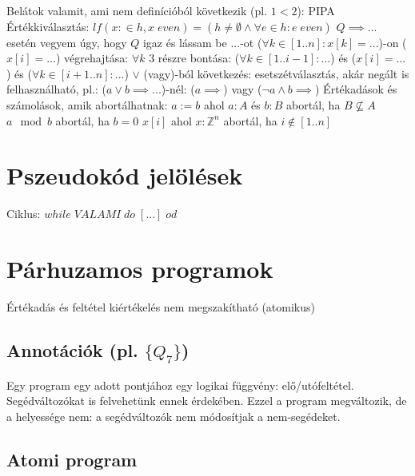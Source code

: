 \documentclass[12pt,a4paper]{article}
\begin{document}
\begin{outline}
	\1 Belátok valamit, ami nem definícióból következik (pl. $1<2$): PIPA
	\1 Értékkiválasztás: $lf(x:\in h, x \; even) = (h \ne \emptyset \wedge \forall e \in h : e \; even)$
	\1 $Q \implies ...$ esetén vegyem úgy, hogy $Q$ igaz és lássam be $...$-ot
	\1 ($\forall k \in [1..n]: x[k]=...$)-on ($x[i]=...$) végrehajtása: $\forall k$ 3 részre bontása: ($\forall k \in [1..i-1]: ...$) és ($x[i]=...$) és ($\forall k \in [i+1..n]: ...$)
	\1 $\lor$ (vagy)-ból következés: esetszétválasztás, akár negált is felhasználható, pl.: ($a \lor b \implies ...$)-nél: ($a \implies$) vagy ($\lnot a \wedge b \implies$)
	\1 Értékadások és számolások, amik abortálhatnak:
		\2 $a := b$ ahol $a : A$ és $b : B$ abortál, ha $B \not \subseteq A$
		\2 $a \mod b$ abortál, ha $b=0$
		\2 $x[i]$ ahol $x:\mathbb{Z}^n$ abortál, ha $i \notin [1..n]$
\end{outline}

\section{Pszeudokód jelölések}

\begin{outline}
	\1 Ciklus: $while \; VALAMI \; do \; [...] \; od$
\end{outline}

\pagebreak

\section{Párhuzamos programok}

\begin{outline}
	\1 Értékadás és feltétel kiértékelés nem megszakítható (atomikus)
\end{outline}

\subsection{Annotációk (pl. $\{Q_7\}$)}

\begin{outline}
	\1 Egy program egy adott pontjához egy logikai függvény: elő/utófeltétel.
	\1 Segédváltozókat is felvehetünk ennek érdekében. Ezzel a program megváltozik, de a helyessége nem: a segédváltozók nem módosítjak a nem-segédeket.
\end{outline}

\subsection{Atomi program}
\end{document}
